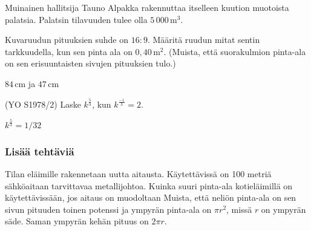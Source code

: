 \begin{tehtavasivu}
\begin{tehtava}
Muinainen hallitsija Tauno Alpakka rakennuttaa itselleen kuution muotoista palatsia.  Palatsin tilavuuden tulee olla $5\,000\,\mathrm{m}^3$. 
\begin{vastaus}
\end{vastaus}
\end{tehtava}

\begin{tehtava}
Kuvaruudun pituuksien suhde on $16:9$. Määritä ruudun mitat sentin tarkkuudella, kun sen pinta ala on \(0,40\,\mathrm{m}^2\). (Muista, että suorakulmion pinta-ala on sen erisuuntaisten sivujen pituuksien tulo.)
\begin{vastaus}
$84\,$cm ja $47$\,cm
\end{vastaus}
\end{tehtava}

\begin{tehtava}
(YO S1978/2) Laske $k^\frac{5}{3}$, kun $k^\frac{-1}{3}=2$. \\
	\begin{vastaus}
		$k^\frac{5}{3}=1/32$
	\end{vastaus}
\end{tehtava}

\subsubsection*{Lisää tehtäviä}

\begin{tehtava}%
Tilan eläimille rakennetaan uutta aitausta. Käytettävissä on 100 metriä sähköaitaan tarvittavaa metallijohtoa. Kuinka suuri pinta-ala kotieläimillä on käytettävissään, jos aitaus on muodoltaan
Muista, että neliön pinta-ala on sen sivun pituuden toinen potenssi ja ympyrän pinta-ala on $\pi r^2$, missä $r$ on ympyrän säde. Saman ympyrän kehän pituus on $2\pi r$.
\begin{vastaus}
\end{vastaus}
\end{tehtava}


\end{tehtavasivu}
